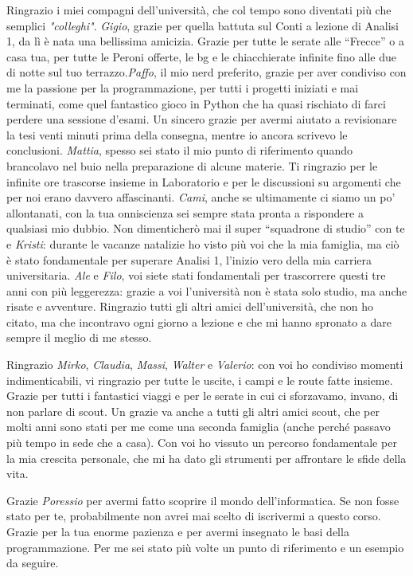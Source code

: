 Ringrazio i miei compagni dell'università, che col tempo sono diventati più che semplici \textit{"colleghi"}. \textit{Gigio}, grazie per quella battuta sul Conti a lezione di Analisi 1, da lì è nata una bellissima amicizia. Grazie per tutte le serate alle “Frecce” o a casa tua, per tutte le Peroni offerte, le bg e le chiacchierate infinite fino alle due di notte sul tuo terrazzo.\textit{Paffo}, il mio nerd preferito, grazie per aver condiviso con me la passione per la programmazione, per tutti i progetti iniziati e mai terminati, come quel fantastico gioco in Python che ha quasi rischiato di farci perdere una sessione d'esami. Un sincero grazie per avermi aiutato a revisionare la tesi venti minuti prima della consegna, mentre io ancora scrivevo le conclusioni. \textit{Mattia}, spesso sei stato il mio punto di riferimento quando brancolavo nel buio nella preparazione di alcune materie. Ti ringrazio per le infinite ore trascorse insieme in Laboratorio e per le discussioni su argomenti che per noi erano davvero affascinanti. \textit{Cami}, anche se ultimamente ci siamo un po' allontanati, con la tua onniscienza sei sempre stata pronta a rispondere a qualsiasi mio dubbio. Non dimenticherò mai il super “squadrone di studio” con te e \textit{Kristi}: durante le vacanze natalizie ho visto più voi che la mia famiglia, ma ciò è stato fondamentale per superare Analisi 1, l’inizio vero della mia carriera universitaria. \textit{Ale} e \textit{Filo}, voi siete stati fondamentali per trascorrere questi tre anni con più leggerezza: grazie a voi l'università non è stata solo studio, ma anche risate e avventure. Ringrazio tutti gli altri amici dell’università, che non ho citato, ma che incontravo ogni giorno a lezione e che mi hanno spronato a dare sempre il meglio di me stesso.

Ringrazio \textit{Mirko}, \textit{Claudia}, \textit{Massi}, \textit{Walter} e \textit{Valerio}: con voi ho condiviso momenti indimenticabili, vi ringrazio per tutte le uscite, i campi e le route fatte insieme. Grazie per tutti i fantastici viaggi e per le serate in cui ci sforzavamo, invano, di non parlare di scout. Un grazie va anche a tutti gli altri amici scout, che per molti anni sono stati per me come una seconda famiglia (anche perché passavo più tempo in sede che a casa). Con voi ho vissuto un percorso fondamentale per la mia crescita personale, che mi ha dato gli strumenti per affrontare le sfide della vita.

Grazie \textit{Poressio} per avermi fatto scoprire il mondo dell'informatica. Se non fosse stato per te, probabilmente non avrei mai scelto di iscrivermi a questo corso. Grazie per la tua enorme pazienza e per avermi insegnato le basi della programmazione. Per me sei stato più volte un punto di riferimento e un esempio da seguire.


